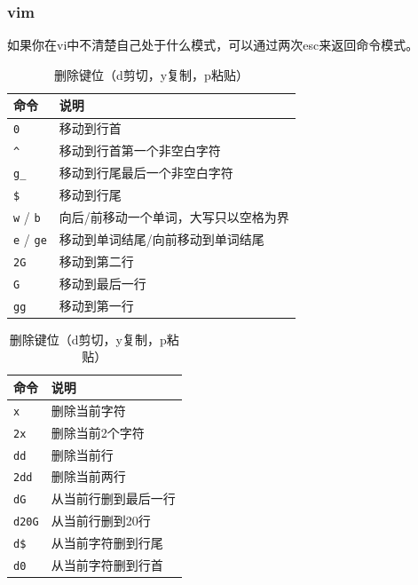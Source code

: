 \subsubsection{vim}
如果你在vi中不清楚自己处于什么模式，可以通过两次esc来返回命令模式。
\begin{table}[H]
	\centering
	\begin{minipage}{0.48\linewidth}
		\centering
		\begin{tabular}{|l|l|}
			\hline
			\textbf{命令}          & \textbf{说明}         \\
			\hline
			\verb|0|             & 移动到行首               \\
			\hline
			\verb|^|             & 移动到行首第一个非空白字符       \\
			\hline
			\verb|g_|            & 移动到行尾最后一个非空白字符      \\
			\hline
			\verb|$|             & 移动到行尾               \\
			\hline
			\verb|w| / \verb|b|  & 向后/前移动一个单词，大写只以空格为界 \\
			\hline
			\verb|e| / \verb|ge| & 移动到单词结尾/向前移动到单词结尾   \\
			\hline
			\verb|2G|            & 移动到第二行              \\
			\hline
			\verb|G|             & 移动到最后一行             \\
			\hline
			\verb|gg|            & 移动到第一行              \\
			\hline
		\end{tabular}
		\caption{vim 常用移动键位}
	\end{minipage}
	\hfill
	\begin{minipage}{0.48\linewidth}
		\centering
		\begin{tabular}{|l|l|}
			\hline
			\textbf{命令} & \textbf{说明} \\
			\hline
			\verb|x|    & 删除当前字符      \\
			\hline
			\verb|2x|   & 删除当前2个字符    \\
			\hline
			\verb|dd|   & 删除当前行       \\
			\hline
			\verb|2dd|  & 删除当前两行      \\
			\hline
			\verb|dG|   & 从当前行删到最后一行  \\
			\hline
			\verb|d20G| & 从当前行删到20行   \\
			\hline
			\verb|d$|   & 从当前字符删到行尾   \\
			\hline
			\verb|d0|   & 从当前字符删到行首   \\
			\hline
		\end{tabular}
		\caption{删除键位（d剪切，y复制，p粘贴）}
	\end{minipage}
\end{table}

